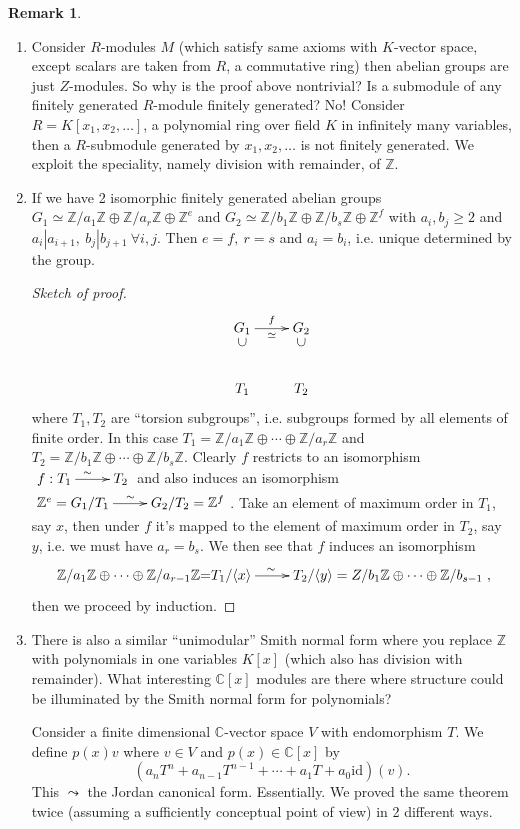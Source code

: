 \documentclass[a4paper]{article}
\theoremstyle{definition}
\newtheorem*{remark}{Remark}
\begin{document}
\begin{remark}
\begin{enumerate}
    \item Consider $R$-modules $M$ (which satisfy same axioms with $K$-vector space, except scalars are taken from $R$, a commutative ring) then abelian groups are just $Z$-modules. So why is the proof above nontrivial? Is a submodule of any finitely generated $R$-module finitely generated? No! Consider $R=K[x_1,x_2,\ldots]$, a polynomial ring over field $K$ in infinitely many variables, then a $R$-submodule generated by $x_1,x_2,\ldots$ is not finitely generated. We exploit the speciality, namely division with remainder, of $\mathbb Z$.
    \item If we have 2 isomorphic finitely generated abelian groups $G_1 \simeq \mathbb Z/a_1\mathbb Z\oplus \mathbb Z/a_r\mathbb Z \oplus \mathbb Z^e$ and $G_2 \simeq \mathbb Z/b_1\mathbb Z\oplus \mathbb Z/b_s\mathbb Z \oplus \mathbb Z^f$ with $a_i,b_j\geq 2$ and $a_i|a_{i+1},\ b_j|b_{j+1} \ \forall i,j$. Then $e=f,\ r=s$ and $a_i=b_i$, i.e. unique determined by the group.
    \begin{proof}[Sketch of proof]
    \[
    \xymatrix{
    {\underset{\rotatebox{90}{$\subset$}}{G_1}} \ar[r]_{\simeq}^f & {\underset{\rotatebox{90}{$\subset$}}{G_2}} \\
    T_1 & T_2
    }
    \]
    where $T_1,T_2$ are ``torsion subgroups'', i.e. subgroups formed by all elements of finite order. In this case $T_1=\mathbb Z/a_1\mathbb Z\oplus \cdots \oplus \mathbb Z/a_r\mathbb Z$ and $T_2=\mathbb Z/b_1\mathbb Z\oplus \cdots \oplus\mathbb Z/b_s\mathbb Z$. Clearly $f$ restricts to an isomorphism $\xymatrix{
    f:T_1 \ar[r]^\sim &T_2
    }$ and also induces an isomorphism $\xymatrix{
    \mathbb Z^e=G_1/T_1 \ar[r]^\sim &G_2/T_2=\mathbb Z^f
    }$. Take an element of maximum order in $T_1$, say $x$, then under $f$ it's mapped to the element of maximum order in $T_2$, say $y$, i.e. we must have $a_r=b_s$. We then see that $f$ induces an isomorphism
    \[
    \xymatrix{
    \mathbb Z/a_1 \mathbb Z \oplus \cdots \oplus \mathbb Z/a_{r-1} \mathbb Z \mathbb =T_1/\langle x\rangle \ar[r]^\sim &T_2/\langle y\rangle=\mathbb \mathbb Z/b_1 \mathbb Z \oplus \cdots \oplus \mathbb Z/b_{s-1}
    },
    \]
    then we proceed by induction.
    \end{proof}
    \item There is also a similar ``unimodular'' Smith normal form where you replace $\mathbb Z$ with polynomials in one variables $K[x]$ (which also has division with remainder). What interesting $\mathbb C[x]$ modules are there where structure could be illuminated by the Smith normal form for polynomials?

    Consider a finite dimensional $\mathbb C$-vector space $V$ with endomorphism $T$. We define $p(x)v$ where $v\in V$ and $p(x)\in \mathbb C[x]$ by
    \[
    \left(a_n T^n + a_{n-1} T^{n-1}+\cdots + a_1 T+a_0 \text{id} \right)(v).
    \]
    This $\leadsto$ the Jordan canonical form. Essentially. We proved the same theorem twice (assuming a sufficiently conceptual point of view) in 2 different ways.
\end{enumerate}
\end{remark}
\end{document}
